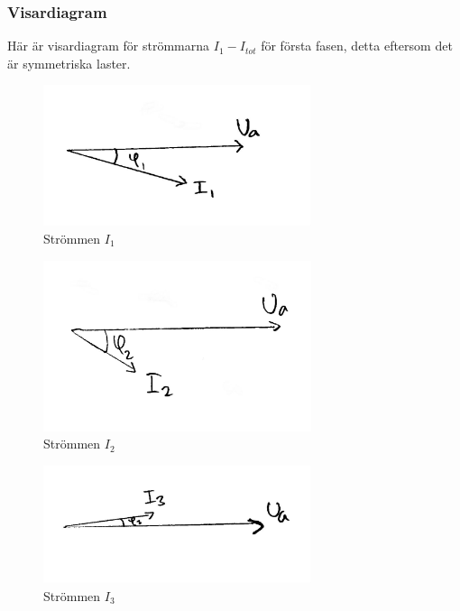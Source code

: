 \documentclass{article}
\begin{document}
  \subsubsection{Visardiagram}
  Här är visardiagram för strömmarna $I_1 - I_{tot}$ för första fasen, detta eftersom det är symmetriska laster.


  \begin{figure}[H]
  \begin{center}
  \includegraphics[width=0.7\textwidth]{img/I1.jpg} %
  \caption{Strömmen $I_1$}
  \end{center}
  \end{figure}

  \begin{figure}[H]
  \begin{center}
  \includegraphics[width=0.7\textwidth]{img/I2.jpg} %
  \caption{Strömmen $I_2$}
  \end{center}
  \end{figure}

  \begin{figure}[H]
  \begin{center}
  \includegraphics[width=0.7\textwidth]{img/I3.jpg} %
  \caption{Strömmen $I_3$}
  \end{center}
  \end{figure}
\end{document}
